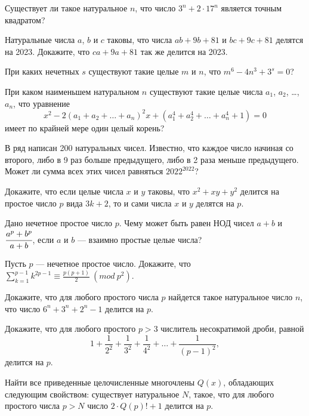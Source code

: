 
Существует ли такое натуральное $n$, что число $3^n+2\cdot 17^n$ является точным квадратом?

Натуральные числа $a$, $b$ и $c$ таковы, что числа $ab + 9b + 81$ и $bc + 9c + 81$ делятся на 2023. Докажите, что $ca + 9a + 81$ так же делится на 2023.

При каких нечетных $s$ существуют такие целые $m$ и $n$, что $m^6 - 4n^3 + 3^s = 0$?

При каком наименьшем натуральном $n$ существуют такие целые числа $a_1$, $a_2$, …, $a_n$, что уравнение $$x^2-2(a_1+a_2+\ldots+a_n)^2x + (a_1^4+a_2^4+\ldots+a_n^4+1)=0$$ имеет по крайней мере один целый корень?

В ряд написан 200 натуральных чисел. Известно, что каждое число начиная со второго, либо в 9 раз больше предыдущего, либо в 2 раза меньше предыдущего. Может ли сумма всех этих чисел равняться $2022^{2022}$?

Докажите, что если целые числа $x$ и $y$ таковы, что $x^2+xy+y^2$ делится на простое число $p$ вида $3k+2$, то и сами числа $x$ и $y$ делятся на $p$.

Дано нечетное простое число $p$. Чему может быть равен НОД чисел $a+b$ и $\cfrac{a^p+b^p}{a+b}$, если $a$ и $b$ — взаимно простые целые числа?

Пусть $p$ — нечетное простое число. Докажите, что $\sum\limits_{k=1}^{p-1} k^{2p-1}\equiv \frac{p(p+1)}{2} \ (mod \ p^2)$.

Докажите, что для любого простого числа $p$ найдется такое натуральное число $n$, что число $6^n+3^n+2^n-1$ делится на $p$.

Докажите, что для любого простого $p>3$ числитель несократимой дроби, равной $$1+\frac{1}{2^2}+\frac{1}{3^2}+\frac{1}{4^2}+\ldots+\frac{1}{(p-1)^2},$$
делится на $p$.

Найти все приведенные целочисленные многочлены $Q(x)$, обладающих следующим свойством: существует натуральное $N$, такое, что для любого простого числа $p>N$ число $2\cdot Q(p)!+1$ делится на $p$.